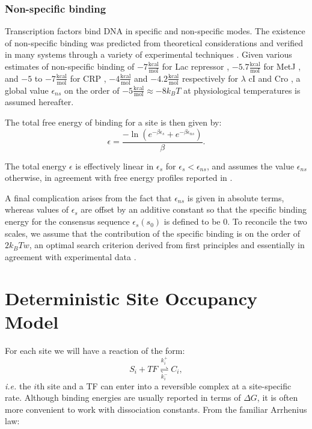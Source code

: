 \documentclass{article}
\begin{document}
\subsubsection{Non-specific binding}
Transcription factors bind DNA in specific and non-specific modes.
The existence of non-specific binding was predicted from theoretical
considerations \cite{kaohuang77} and verified in many systems through
a variety of experimental techniques \cite{revzin90}.  Given various
estimates of non-specific binding of
$-7\frac{\mathrm{kcal}}{\textrm{mol}}$ for Lac repressor
\cite{wang77}, $-5.7\frac{\mathrm{kcal}}{\textrm{mol}}$ for MetJ
\cite{augustus10}, and $-5$ to $-7 \frac{\mathrm{kcal}}{\textrm{mol}}$
for CRP \cite{takahashi79}, $-4\frac{\mathrm{kcal}}{\textrm{mol}}$ and
$-4.2 \frac{\mathrm{kcal}}{\textrm{mol}}$ respectively for $\lambda$
cI and Cro \cite{bakk2004}, a global value $\epsilon_{ns}$ on the
order of $-5\frac{\mathrm{kcal}}{\textrm{mol}}\approx -8 k_BT$ at
physiological temperatures is assumed hereafter.

The total free energy of binding for a site is then given by:
\begin{equation}
  \epsilon = \frac{-\ln(e^{-\beta \epsilon_s} + e^{-\beta \epsilon_{ns}})}{\beta}.\label{eq:totalbindingenergy}
\end{equation}

  The total energy $\epsilon$ is effectively linear in $\epsilon_s$ for $\epsilon_s < \epsilon_{ns}$, and assumes the value $\epsilon_{ns}$ otherwise, in agreement with free energy profiles reported in \cite{maerkl2007}.

  A final complication arises from the fact that $\epsilon_{ns}$ is
  given in absolute terms, whereas values of $\epsilon_s$ are offset
  by an additive constant so that the specific binding energy for the
  consensus sequence $\epsilon_s(s_0)$ is defined to be 0.  To
  reconcile the two scales, we assume that the contribution of the
  specific binding is on the order of $2k_BT w$, an optimal search
  criterion derived from first principles \cite{gerland02} and
  essentially in agreement with experimental data \cite{bakk2004}.
\section{Deterministic Site Occupancy Model}
For each site we will have a reaction of the form:
\begin{equation}
  \label{eq:s_reaction}
  S_i + TF \overset{k^+_i}{\underset{k^-_i}{\rightleftharpoons}} C_i,
\end{equation}
\textit{i.e.} the $i$th site and a TF can enter into a reversible
complex at a site-specific rate.  Although binding energies are
usually reported in terms of $\Delta G$, it is often more convenient
to work with dissociation constants.  From the familiar Arrhenius law:
\end{document}
